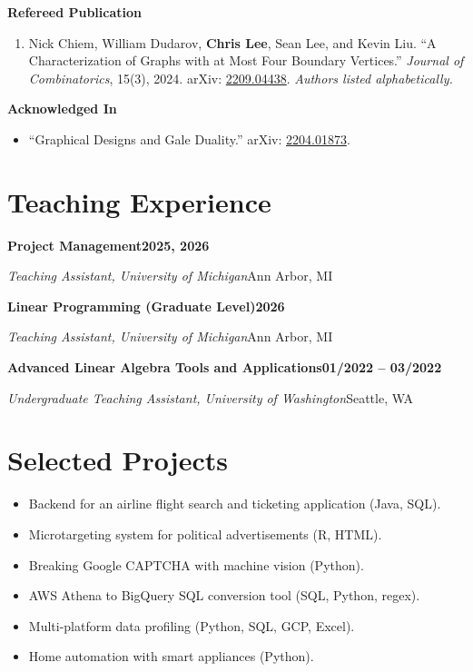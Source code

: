 \documentclass[10pt,letterpaper]{article}
\newcommand{\entry}[4]{%
  \textbf{#1}\hfill\textbf{#2}\par
  \emph{#3}\hfill #4\par
}
\newcommand{\paperstatus}[1]{{\color{muted}\emph{#1}}}
\begin{document}
\vspace{0.12em}
{\small\bfseries Refereed Publication}
\begin{enumerate}
  \item Nick Chiem, William Dudarov, \textbf{Chris Lee}, Sean Lee, and Kevin Liu.
    ``A Characterization of Graphs with at Most Four Boundary Vertices.''
    \emph{Journal of Combinatorics}, 15(3), 2024.
    arXiv: \href{https://arxiv.org/abs/2209.04438}{2209.04438}.
    \paperstatus{Authors listed alphabetically.}
\end{enumerate}

\vspace{0.12em}
{\small\bfseries Acknowledged In}
\begin{itemize}
  \item ``Graphical Designs and Gale Duality.''
    arXiv: \href{https://arxiv.org/abs/2204.01873}{2204.01873}.
\end{itemize}

\section*{Teaching Experience}

\entry
  {Project Management}
  {2025, 2026}
  {Teaching Assistant, University of Michigan}
  {Ann Arbor, MI}

\vspace{0.3em}
\entry
  {Linear Programming (Graduate Level)}
  {2026}
  {Teaching Assistant, University of Michigan}
  {Ann Arbor, MI}

\vspace{0.3em}
\entry
  {Advanced Linear Algebra Tools and Applications}
  {01/2022 -- 03/2022}
  {Undergraduate Teaching Assistant, University of Washington}
  {Seattle, WA}

\section*{Selected Projects}

\begin{itemize}
  \item Backend for an airline flight search and ticketing application (Java, SQL).
  \item Microtargeting system for political advertisements (R, HTML).
  \item Breaking Google CAPTCHA with machine vision (Python).
  \item AWS Athena to BigQuery SQL conversion tool (SQL, Python, regex).
  \item Multi-platform data profiling (Python, SQL, GCP, Excel).
  \item Home automation with smart appliances (Python).
\end{itemize}
\end{document}
